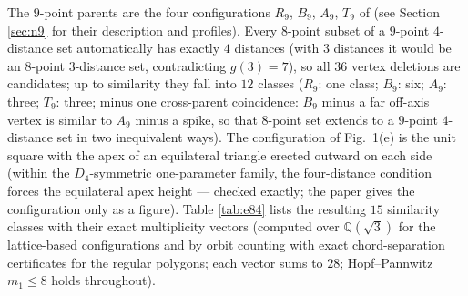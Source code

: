 \documentclass[11pt]{article}
\theoremstyle{definition}
\theoremstyle{remark}
\newcommand{\Q}{\mathbb{Q}}
\begin{document}
The $9$-point parents are the four configurations $R_9$, $B_9$, $A_9$, $T_9$ of
\cite[Theorem~1]{ErFi96} (see Section \ref{sec:n9} for their description and profiles).
Every $8$-point subset of a $9$-point $4$-distance set automatically has exactly $4$
distances (with $3$ distances it would be an $8$-point $3$-distance set, contradicting
$g(3) = 7$), so all $36$ vertex deletions are candidates; up to similarity they fall
into $12$ classes ($R_9$: one class; $B_9$: six; $A_9$: three; $T_9$: three; minus one
cross-parent coincidence: $B_9$ minus a far off-axis vertex is similar to $A_9$ minus a
spike, so that $8$-point set extends to a $9$-point $4$-distance set in two
inequivalent ways). The configuration of Fig.~1(e) is the unit square with the apex of
an equilateral triangle erected outward on each side (within the $D_4$-symmetric
one-parameter family, the four-distance condition forces the equilateral apex height
--- checked exactly; the paper gives the configuration only as a figure). Table
\ref{tab:e84} lists the resulting $15$ similarity classes with their exact
multiplicity vectors (computed over $\Q(\sqrt3)$ for the lattice-based configurations
and by orbit counting with exact chord-separation certificates for the regular
polygons; each vector sums to $28$; Hopf--Pannwitz $m_1 \le 8$ holds throughout).
\end{document}
